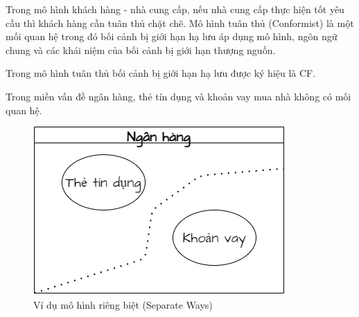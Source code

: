 Trong mô hình khách hàng - nhà cung cấp, nếu nhà cung cấp thực hiện tốt yêu cầu thì khách hàng cần tuân thủ chặt chẽ. Mô hình tuân thủ (Conformist) là một mối quan hệ trong đó bối cảnh bị giới hạn hạ lưu áp dụng mô hình, ngôn ngữ chung và các khái niệm của bối cảnh bị giới hạn thượng nguồn.

Trong mô hình tuân thủ bối cảnh bị giới hạn hạ lưu được ký hiệu là CF.






















\begin{example} Trong miền vấn đề ngân hàng, thẻ tín dụng và khoản vay mua nhà không có mối quan hệ.

\begin{figure}[H]

\centering

\includegraphics[scale = 0.5]{pictures/mo_hinh_rieng_biet_separate_ways/main.drawio.png}

\caption{Ví dụ mô hình riêng biệt (Separate Ways)}

\end{figure}

\end{example}

